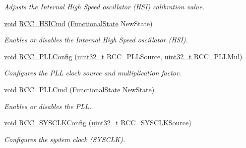 \begin{DoxyCompactItemize}
\begin{DoxyCompactList}\small\item\em Adjusts the Internal High Speed oscillator (H\+SI) calibration value. \end{DoxyCompactList}\item 
\hyperlink{usb__devapi_8h_afabf60e7f57651d6d595a02c75f07cd0}{void} \hyperlink{group___r_c_c___private___functions_ga0c6772a1e43765909495f57815ef69e2}{R\+C\+C\+\_\+\+H\+S\+I\+Cmd} (\hyperlink{agilefox_2library_2inc_2stm32f10x__type_8h_ac9a7e9a35d2513ec15c3b537aaa4fba1}{Functional\+State} New\+State)
\begin{DoxyCompactList}\small\item\em Enables or disables the Internal High Speed oscillator (H\+SI). \end{DoxyCompactList}\item 
\hyperlink{usb__devapi_8h_afabf60e7f57651d6d595a02c75f07cd0}{void} \hyperlink{group___r_c_c___private___functions_ga0f67634cbe721f2c42f022d2a93229c8}{R\+C\+C\+\_\+\+P\+L\+L\+Config} (\hyperlink{_p_e___types_8h_a33594304e786b158f3fb30289278f5af}{uint32\+\_\+t} R\+C\+C\+\_\+\+P\+L\+L\+Source, \hyperlink{_p_e___types_8h_a33594304e786b158f3fb30289278f5af}{uint32\+\_\+t} R\+C\+C\+\_\+\+P\+L\+L\+Mul)
\begin{DoxyCompactList}\small\item\em Configures the P\+LL clock source and multiplication factor. \end{DoxyCompactList}\item 
\hyperlink{usb__devapi_8h_afabf60e7f57651d6d595a02c75f07cd0}{void} \hyperlink{group___r_c_c___private___functions_ga84dee53c75e58fdb53571716593c2272}{R\+C\+C\+\_\+\+P\+L\+L\+Cmd} (\hyperlink{agilefox_2library_2inc_2stm32f10x__type_8h_ac9a7e9a35d2513ec15c3b537aaa4fba1}{Functional\+State} New\+State)
\begin{DoxyCompactList}\small\item\em Enables or disables the P\+LL. \end{DoxyCompactList}\item 
\hyperlink{usb__devapi_8h_afabf60e7f57651d6d595a02c75f07cd0}{void} \hyperlink{group___r_c_c___private___functions_ga3551a36a8f0a3dc96a74d6b939048337}{R\+C\+C\+\_\+\+S\+Y\+S\+C\+L\+K\+Config} (\hyperlink{_p_e___types_8h_a33594304e786b158f3fb30289278f5af}{uint32\+\_\+t} R\+C\+C\+\_\+\+S\+Y\+S\+C\+L\+K\+Source)
\begin{DoxyCompactList}\small\item\em Configures the system clock (S\+Y\+S\+C\+LK). \end{DoxyCompactList}\item 

\end{DoxyCompactItemize}
